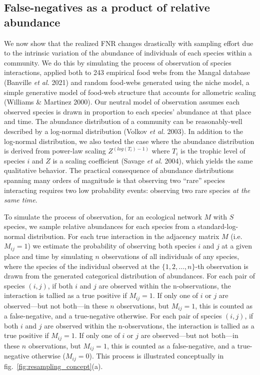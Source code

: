 \documentclass[10pt,oneside]{article}
\begin{document}
\hypertarget{false-negatives-as-a-product-of-relative-abundance}{%
\subsection{False-negatives as a product of relative
abundance}\label{false-negatives-as-a-product-of-relative-abundance}}

We now show that the realized FNR changes drastically with sampling
effort due to the intrinsic variation of the abundance of individuals of
each species within a community. We do this by simulating the process of
observation of species interactions, applied both to 243 empirical food
webs from the Mangal database (Banville \emph{et al.} 2021) and random
food-webs generated using the niche model, a simple generative model of
food-web structure that accounts for allometric scaling (Williams \&
Martinez 2000). Our neutral model of observation assumes each observed
species is drawn in proportion to each species' abundance at that place
and time. The abundance distribution of a community can be
reasonably-well described by a log-normal distribution (Volkov \emph{et
al.} 2003). In addition to the log-normal distribution, we also tested
the case where the abundance distribution is derived from power-law
scaling \(Z^{(log(T_i)-1)}\) where \(T_i\) is the trophic level of
species \(i\) and \(Z\) is a scaling coefficient (Savage \emph{et al.}
2004), which yields the same qualitative behavior. The practical
consequence of abundance distributions spanning many orders of magnitude
is that observing two ``rare'' species interacting requires two low
probability events: observing two rare species \emph{at the same time}.

To simulate the process of observation, for an ecological network \(M\)
with \(S\) species, we sample relative abundances for each species from
a standard-log-normal distribution. For each true interaction in the
adjacency matrix \(M\) (i.e.~\(M_{ij}=1\)) we estimate the probability
of observing both species \(i\) and \(j\) at a given place and time by
simulating \(n\) observations of all individuals of any species, where
the species of the individual observed at the \(\{1,2,\dots,n\}\)-th
observation is drawn from the generated categorical distribution of
abundances. For each pair of species \((i,j)\), if both \(i\) and \(j\)
are observed within the n-observations, the interaction is tallied as a
true positive if \(M_{ij}=1\). If only one of \(i\) or \(j\) are
observed---but not both---in these \(n\) observations, but \(M_{ij}=1\),
this is counted as a false-negative, and a true-negative otherwise. For
each pair of species \((i,j)\), if both \(i\) and \(j\) are observed
within the n-observations, the interaction is tallied as a true positive
if \(M_{ij}=1\). If only one of \(i\) or \(j\) are observed---but not
both---in these \(n\) observations, but \(M_{ij}=1\), this is counted as
a false-negative, and a true-negative otherwise (\(M_{ij} = 0\)). This
process is illustrated conceptually in
fig.~\ref{fig:resampling_concept}(a).
\end{document}
